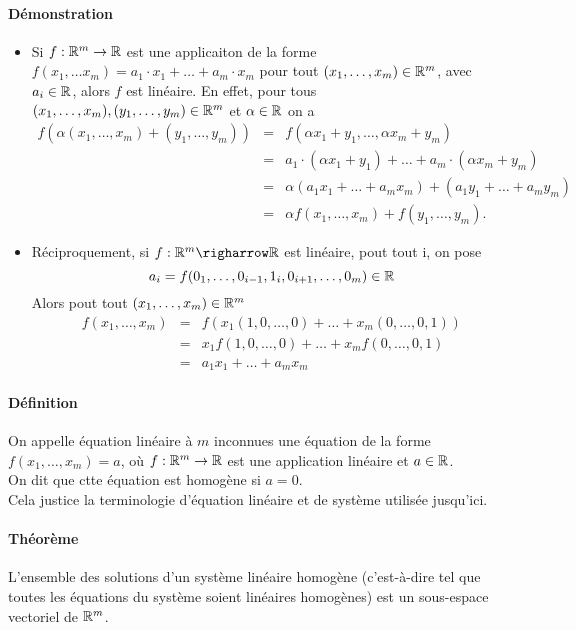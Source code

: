 \paragraph{Démonstration}
\begin{itemize}
  \item Si $f: \mathbb{R}^m \rightarrow \mathbb{R}$ est une applicaiton de la forme $f(x_1, \ldots x_m) = a_1 \cdot x_1 + \ldots + a_m \cdot x_m$ pour tout $(x_1, \ldots, x_m) \in \mathbb{R}^m$, avec $a_i \in \mathbb{R}$, alors $f$ est linéaire. En effet, pour tous $(x_1, \ldots, x_m), (y_1, \ldots, y_m) \in \mathbb{R}^m$ et $\alpha \in \mathbb{R}$ on a
    \begin{eqnarray*}
      f(\alpha(x_1, \ldots, x_m) + (y_1, \ldots, y_m)) &=& f(\alpha x_1 + y_1, \ldots, \alpha x_m + y_m) \\
        &=& a_1 \cdot (\alpha x_1 + y_1) + \ldots + a_m \cdot (\alpha x_m + y_m) \\
        &=& \alpha (a_1 x_1 + \ldots + a_m x_m) + (a_1 y_1 + \ldots + a_m y_m) \\
        &=& \alpha f(x_1, \ldots, x_m) + f(y_1, \ldots, y_m).
    \end{eqnarray*}
  \item Réciproquement, si $f: \R^m \righarrow \R$ est linéaire, pout tout i, on pose 
    $$a_i = f(0_1, \ldots, 0_{i-1}, 1_i, 0_{i+1}, \ldots, 0_m) \in \mathbb{R}$$
    Alors pout tout $(x_1, \ldots, x_m) \in \mathbb{R}^m$
    \begin{eqnarray*}
      f(x_1, \ldots, x_m) &=& f(x_1 (1, 0, \ldots, 0) + \ldots + x_m (0, \ldots, 0, 1)) \\
        &=& x_1 f(1, 0, \ldots, 0) + \ldots + x_m f(0, \ldots, 0, 1) \\
        &=& a_1 x_1 + \ldots + a_m x_m
    \end{eqnarray*}
\end{itemize}

\paragraph*{Définition} On appelle équation linéaire à $m$ inconnues une équation de la forme $f(x_1, \ldots, x_m) = a$, où $f: \mathbb{R}^m \rightarrow \mathbb{R}$ est une application linéaire et $a \in \mathbb{R}$. \\
On dit que ctte équation est homogène si $a=0$. \\
Cela justice la terminologie d'équation linéaire et de système utilisée jusqu'ici.

\paragraph{Théorème} L'ensemble des solutions d'un système linéaire homogène (c'est-à-dire tel que toutes les équations du système soient linéaires homogènes) est un sous-espace vectoriel de $\mathbb{R}^m$.
